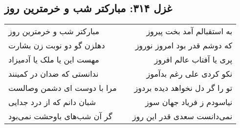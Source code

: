 \begin{center}
\section*{غزل ۳۱۴: مبارکتر شب و خرمترین روز}
\label{sec:314}
\begin{longtable}{l p{0.5cm} r}
مبارکتر شب و خرمترین روز
&&
به استقبالم آمد بخت پیروز
\\
دهلزن گو دو نوبت زن بشارت
&&
که دوشم قدر بود امروز نوروز
\\
مهست این یا ملک یا آدمیزاد
&&
پری یا آفتاب عالم افروز
\\
ندانستی که ضدان در کمینند
&&
نکو کردی علی رغم بدآموز
\\
مرا با دوست ای دشمن وصالست
&&
تو را گر دل نخواهد دیده بردوز
\\
شبان دانم که از درد جدایی
&&
نیاسودم ز فریاد جهان سوز
\\
گر آن شب‌های باوحشت نمی‌بود
&&
نمی‌دانست سعدی قدر این روز
\\
\end{longtable}
\end{center}
